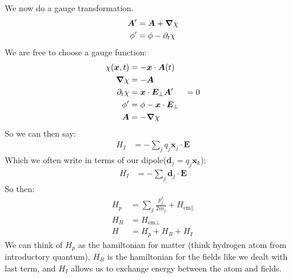 We now do a gauge transformation. 
\begin{align*}
	\bm{A}' &= \bm{A} + \bm{\nabla}\chi \\
	\phi' &= \phi - \partial_t \chi
\end{align*}
We are free to choose a gauge function:
\begin{align*}
	\chi(\bm{x},t) &= -\bm{x}\cdot\bm{A}(t) \\
	\bm{\nabla}\chi &= -\bm{A} \\
	\partial_t \chi &= \bm{x}\cdot\bm{E}_\perp 
	\bm{A}' &= 0 \\
	\phi' &= \phi - \bm{x}\cdot\bm{E}_\perp \\
	\bm{A} &= -\bm{\nabla}\chi
\end{align*}
So we can then say:
\begin{align*}
	H_I &= -\sum_j q_j\bm{x}_j\cdot\bm{E}
\end{align*}
Which we often write in terms of our dipole($\bm{d}_j = q_j\bm{x}_k$):
\begin{align*}
	H_I &= -\sum_j \bm{d}_j\cdot\bm{E}
\end{align*}
So then:
\begin{align*}
	H_p &= \sum_j \frac{p_j^2}{2m_j} + H_{\text{em}\parallel} \\
	H_R &= H_{\text{em}\perp} \\
	H &= H_p + H_R + H_I 
\end{align*}
We can think of $H_p$ as the hamiltonian for matter (think hydrogen atom from introductory quantum), $H_R$ is the hamiltonian for the fields like we dealt with last term, and $H_I$ allows us to exchange energy between the atom and fields.
